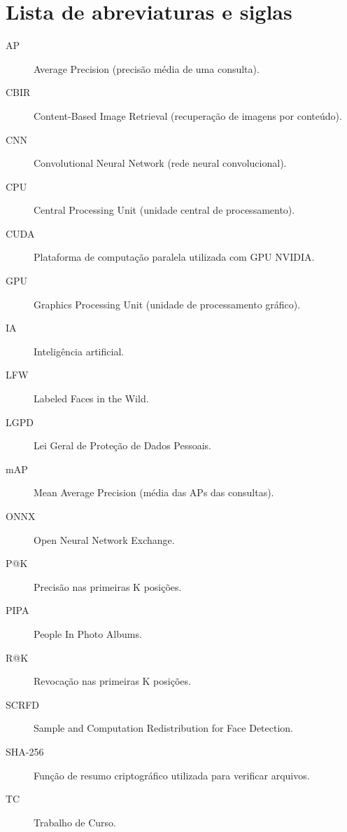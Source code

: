 \chapter*{Lista de abreviaturas e siglas}
\begin{description}
\item[AP] Average Precision (precisão média de uma consulta).
\item[CBIR] Content-Based Image Retrieval (recuperação de imagens por conteúdo).
\item[CNN] Convolutional Neural Network (rede neural convolucional).
\item[CPU] Central Processing Unit (unidade central de processamento).
\item[CUDA] Plataforma de computação paralela utilizada com GPU NVIDIA.
\item[GPU] Graphics Processing Unit (unidade de processamento gráfico).
\item[IA] Inteligência artificial.
\item[LFW] Labeled Faces in the Wild.
\item[LGPD] Lei Geral de Proteção de Dados Pessoais.
\item[mAP] Mean Average Precision (média das APs das consultas).
\item[ONNX] Open Neural Network Exchange.
\item[P@K] Precisão nas primeiras K posições.
\item[PIPA] People In Photo Albums.
\item[R@K] Revocação nas primeiras K posições.
\item[SCRFD] Sample and Computation Redistribution for Face Detection.
\item[SHA-256] Função de resumo criptográfico utilizada para verificar arquivos.
\item[TC] Trabalho de Curso.
\end{description}
\clearpage
\tableofcontents
\clearpage
